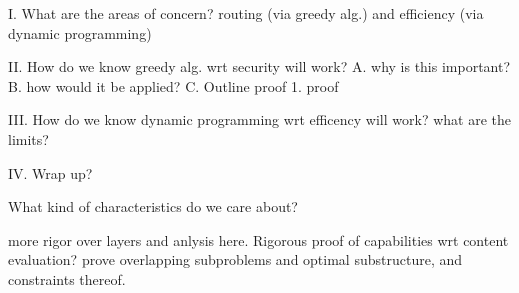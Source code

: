 \color{red}
I. What are the areas of concern? routing (via greedy alg.) and efficiency (via dynamic programming)

II. How do we know greedy alg. wrt security will work?
A. why is this important?
B. how would it be applied?
C. Outline proof
1. proof


III. How do we know dynamic programming wrt efficency will work? what are the limits?

IV. Wrap up?


What kind of characteristics do we care about? 

more rigor over layers and anlysis here.  Rigorous proof of capabilities wrt content evaluation? prove overlapping subproblems and optimal substructure, and constraints thereof.
\color{black}